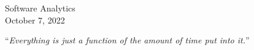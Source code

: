 \documentclass[11pt,twoside,english,singlespacing,headsepline,consistentlayout]{auxiliary/si-msc-thesis}
\theoremstyle{definition}
\begin{document}
\begin{titlepage}
\begin{center}
     
    \vfill
    
    {\large Software Analytics}\\
    {\large October 7, 2022}\\[4cm]
    
    \vfill
    \end{center}
\end{titlepage}



\cleardoublepage
\vspace*{0.2\textheight}

\begin{flushright}
	\noindent\enquote{\itshape Everything is just a function of the amount of time put into it.}\bigbreak
\end{flushright}
    


%


%


\tableofcontents 
\listoffigures 
\listoftables
\end{document}
